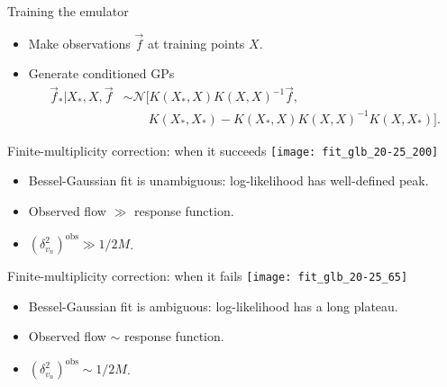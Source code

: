 \documentclass{beamer}
\begin{document}
\begin{frame}{Training the emulator}
  \begin{itemize}
    \item Make observations $\vec f$ at training points $X$.
    \item Generate conditioned GPs
        \begin{align*}
          \vec f_* | X_*,X,\vec f &\sim \mathcal N[K(X_*,X)K(X,X)^{-1}\vec f, \\
          &\qquad {} K(X_*,X_*) - K(X_*,X)K(X,X)^{-1}K(X,X_*)].
        \end{align*}
  \end{itemize}

  \centering


\end{frame}


\begin{frame}{Finite-multiplicity correction:  when it succeeds}
  \texttt{[image: fit\_glb\_20-25\_200]}

  \begin{itemize}
    \item Bessel-Gaussian fit is unambiguous:  log-likelihood has well-defined peak.
    \item Observed flow $\gg$ response function.
    \item $(\delta_{v_n}^2)^\text{obs} \gg 1/2M$.
  \end{itemize}
\end{frame}


\begin{frame}{Finite-multiplicity correction:  when it fails}
  \texttt{[image: fit\_glb\_20-25\_65]}

  \begin{itemize}
    \item Bessel-Gaussian fit is ambiguous:  log-likelihood has a long plateau.
    \item Observed flow $\sim$ response function.
    \item $(\delta_{v_n}^2)^\text{obs} \sim 1/2M$.
  \end{itemize}
\end{frame}
\end{document}
